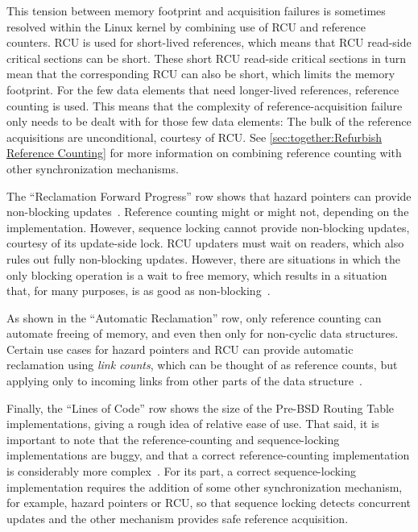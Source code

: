 This tension between memory footprint and acquisition
failures is sometimes resolved within the Linux kernel by combining use
of RCU and reference counters.
RCU is used for short-lived references, which means that RCU read-side
critical sections can be short.
These short RCU read-side critical sections in turn mean that the corresponding
RCU  can also be short, which limits the memory footprint.
For the few data elements that need longer-lived references, reference
counting is used.
This means that the complexity of reference-acquisition failure only
needs to be dealt with for those few data elements:  The bulk of
the reference acquisitions are unconditional, courtesy of RCU\@.
See \cref{sec:together:Refurbish Reference Counting}
for more information on combining reference counting with other
synchronization mechanisms.

The ``Reclamation Forward Progress'' row shows that hazard pointers
can provide non-blocking updates~\cite{MagedMichael04a,HerlihyLM02}.
Reference counting might or might not, depending on the implementation.
However, sequence locking cannot provide non-blocking updates, courtesy
of its update-side lock.
RCU updaters must wait on readers, which also rules out fully non-blocking
updates.
However, there are situations in which the only blocking operation is
a wait to free memory, which results in a situation that, for many
purposes, is as good as non-blocking~\cite{MathieuDesnoyers2012URCU}.

As shown in the ``Automatic Reclamation'' row, only reference
counting can automate freeing of memory, and even then only
for non-cyclic data structures.
Certain use cases for hazard pointers and RCU can provide automatic
reclamation using \emph{link counts}, which can be thought of as
reference counts, but applying only to incoming links from other
parts of the data structure~\cite{MagedMichael2018FollyHazptr}.

Finally, the ``Lines of Code'' row shows the size of the Pre-BSD
Routing Table implementations, giving a rough idea of relative ease of use.
That said, it is important to note that the reference-counting and
sequence-locking implementations are buggy, and that a correct
reference-counting implementation is considerably
more complex~\cite{Valois95a,MagedMichael95a}.
For its part, a correct sequence-locking implementation requires
the addition of some other synchronization mechanism, for example,
hazard pointers or RCU, so that sequence locking detects concurrent
updates and the other mechanism provides safe reference acquisition.

